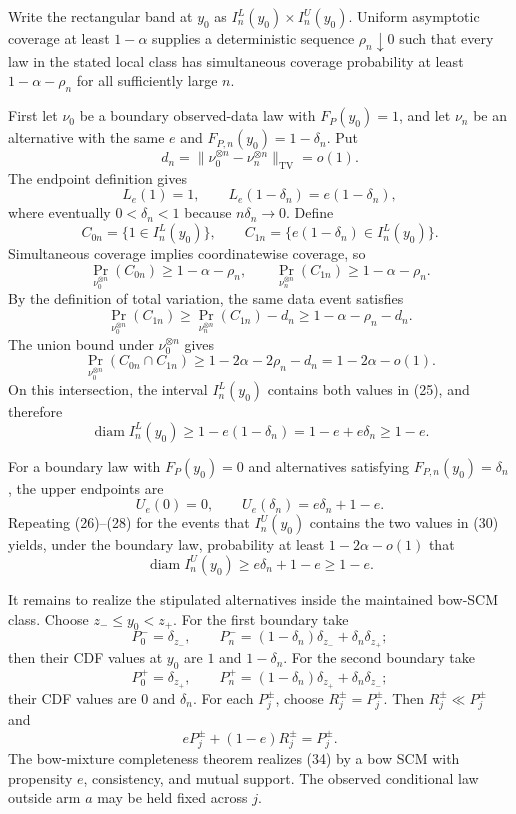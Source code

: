 Write the rectangular band at \(y_0\) as \(I_n^L(y_0)\times I_n^U(y_0)\).  Uniform asymptotic coverage at least \(1-\alpha\) supplies a deterministic sequence \(\rho_n\downarrow0\) such that every law in the stated local class has simultaneous coverage probability at least \(1-\alpha-\rho_n\) for all sufficiently large \(n\).

First let \(\nu_0\) be a boundary observed-data law with \(F_P(y_0)=1\), and let \(\nu_n\) be an alternative with the same \(e\) and \(F_{P,n}(y_0)=1-\delta_n\).  Put
\[
 d_n=\|\nu_0^{\otimes n}-\nu_n^{\otimes n}\|_{\mathrm{TV}}=o(1).
\]
The endpoint definition gives
\[
 L_e(1)=1,
 \qquad
 L_e(1-\delta_n)=e(1-\delta_n), \tag{25}
\]
where eventually \(0<\delta_n<1\) because \(n\delta_n\to0\).  Define
\[
 C_{0n}=\{1\in I_n^L(y_0)\},
 \qquad
 C_{1n}=\{e(1-\delta_n)\in I_n^L(y_0)\}.
\]
Simultaneous coverage implies coordinatewise coverage, so
\[
 \Pr_{\nu_0^{\otimes n}}(C_{0n})\ge1-\alpha-\rho_n,
 \qquad
 \Pr_{\nu_n^{\otimes n}}(C_{1n})\ge1-\alpha-\rho_n. \tag{26}
\]
By the definition of total variation, the same data event satisfies
\[
 \Pr_{\nu_0^{\otimes n}}(C_{1n})
 \ge\Pr_{\nu_n^{\otimes n}}(C_{1n})-d_n
 \ge1-\alpha-\rho_n-d_n. \tag{27}
\]
The union bound under \(\nu_0^{\otimes n}\) gives
\[
 \Pr_{\nu_0^{\otimes n}}(C_{0n}\cap C_{1n})
 \ge1-2\alpha-2\rho_n-d_n
 =1-2\alpha-o(1). \tag{28}
\]
On this intersection, the interval \(I_n^L(y_0)\) contains both values in (25), and therefore
\[
 \operatorname{diam}I_n^L(y_0)
 \ge1-e(1-\delta_n)=1-e+e\delta_n\ge1-e. \tag{29}
\]

For a boundary law with \(F_P(y_0)=0\) and alternatives satisfying \(F_{P,n}(y_0)=\delta_n\), the upper endpoints are
\[
 U_e(0)=0,
 \qquad
 U_e(\delta_n)=e\delta_n+1-e. \tag{30}
\]
Repeating (26)--(28) for the events that \(I_n^U(y_0)\) contains the two values in (30) yields, under the boundary law, probability at least \(1-2\alpha-o(1)\) that
\[
 \operatorname{diam}I_n^U(y_0)\ge e\delta_n+1-e\ge1-e. \tag{31}
\]

It remains to realize the stipulated alternatives inside the maintained bow-SCM class.  Choose \(z_-\le y_0<z_+\).  For the first boundary take
\[
 P_0^-=\delta_{z_-},
 \qquad
 P_n^-=(1-\delta_n)\delta_{z_-}+\delta_n\delta_{z_+}; \tag{32}
\]
then their CDF values at \(y_0\) are \(1\) and \(1-\delta_n\).  For the second boundary take
\[
 P_0^+=\delta_{z_+},
 \qquad
 P_n^+=(1-\delta_n)\delta_{z_+}+\delta_n\delta_{z_-}; \tag{33}
\]
their CDF values are \(0\) and \(\delta_n\).  For each \(P_j^\pm\), choose \(R_j^\pm=P_j^\pm\).  Then \(R_j^\pm\ll P_j^\pm\) and
\[
 eP_j^\pm+(1-e)R_j^\pm=P_j^\pm. \tag{34}
\]
The bow-mixture completeness theorem realizes (34) by a bow SCM with propensity \(e\), consistency, and mutual support.  The observed conditional law outside arm \(a\) may be held fixed across \(j\).

